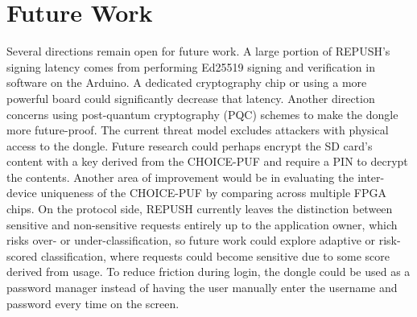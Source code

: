 \section{Future Work}
Several directions remain open for future work. A large portion of REPUSH's signing latency comes from performing Ed25519 signing and verification in software on the Arduino. A dedicated cryptography chip or using a more powerful board could significantly decrease that latency. Another direction concerns using post-quantum cryptography (PQC) schemes to make the dongle more future-proof. The current threat model excludes attackers with physical access to the dongle. Future research could perhaps encrypt the SD card's content with a key derived from the CHOICE-PUF and require a PIN to decrypt the contents. Another area of improvement would be in evaluating the inter-device uniqueness of the CHOICE-PUF by comparing across multiple FPGA chips. On the protocol side, REPUSH currently leaves the distinction between sensitive and non-sensitive requests entirely up to the application owner, which risks over- or under-classification, so future work could explore adaptive or risk-scored classification, where requests could become sensitive due to some score derived from usage. To reduce friction during login, the dongle could be used as a password manager instead of having the user manually enter the username and password every time on the screen.
